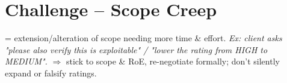 \section{Challenge -- Scope Creep}
 = extension/alteration of scope needing more time \& effort. \textit{Ex: client asks "please also verify this is exploitable" / "lower the rating from HIGH to MEDIUM".} $\Rightarrow$ stick to scope \& RoE, re-negotiate formally; don't silently expand or falsify ratings.

